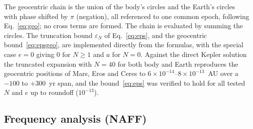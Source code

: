 The geocentric chain is the union of the body's circles and the Earth's circles
with phase shifted by $\pi$ (negation), all referenced to one common epoch,
following Eq.~\eqref{eq:geo}; no cross terms are formed. The chain is evaluated
by summing the circles. The truncation bound $\varepsilon_N$ of
Eq.~\eqref{eq:eps}, and the geocentric bound~\eqref{eq:epsgeo}, are implemented
directly from the formulas, with the special case $e=0$ giving $0$ for $N\ge1$
and $a$ for $N=0$. Against the direct Kepler solution the truncated expansion
with $N=40$ for both body and Earth reproduces the geocentric positions of
Mars, Eros and Ceres to $6\times10^{-14}$--$8\times10^{-13}$~AU over a
$-100$ to $+300$~yr span, and the bound~\eqref{eq:eps} was verified to hold
for all tested $N$ and $e$ up to roundoff ($10^{-13}$).

\subsection{Frequency analysis (NAFF)}
\label{sec:num-naff}

